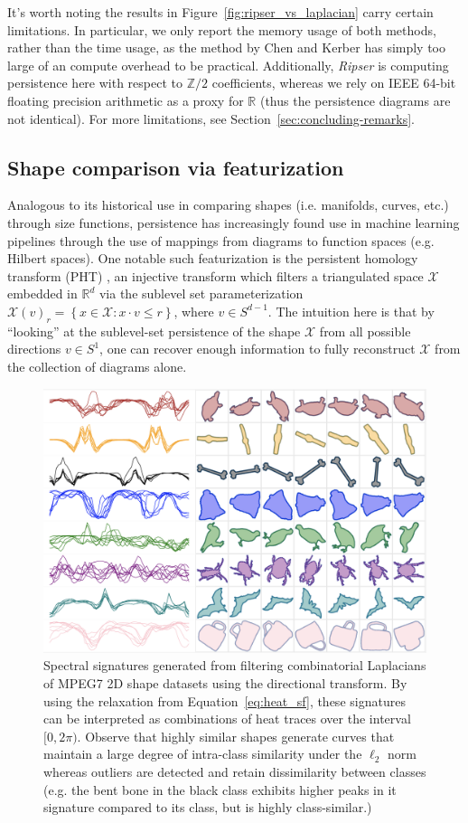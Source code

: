 \documentclass[pdflatex,sn-mathphys-num]{sn-jnl}
\begin{document}
It's worth noting the results in Figure~\ref{fig:ripser_vs_laplacian} carry certain limitations. In particular, we only report the memory usage of both methods, rather than the time usage, as the method by Chen and Kerber has simply too large of an compute overhead to be practical. Additionally, \emph{Ripser} is computing persistence here with respect to \(\mathbb{Z}/2\) coefficients, whereas we rely on IEEE 64-bit floating precision arithmetic as a proxy for \(\mathbb{R}\) (thus the persistence diagrams are not identical). For more limitations, see Section~\ref{sec:concluding-remarks}.

\subsection{Shape comparison via featurization}\label{sec:shape_comparison}

Analogous to its historical use in comparing shapes (i.e. manifolds, curves, etc.) through size functions, persistence has increasingly found use in machine learning pipelines through the use of mappings from diagrams to function spaces (e.g. Hilbert spaces). One notable such featurization is the persistent homology transform (PHT) \cite{turner2014persistent}, an injective transform which filters a triangulated space \(\mathcal{X}\) embedded in \(\mathbb{R}^{d}\) via the sublevel set parameterization \({\mathcal{X}(v)}_{r} = \left\{ x \in \mathcal{X}:x \cdot v \leq r \right\}\), where \(v \in S^{d - 1}\). The intuition here is that by ``looking'' at the sublevel-set persistence of the shape \(\mathcal{X}\) from all possible directions \(v \in S^{1}\), one can recover enough information to fully reconstruct \(\mathcal{X}\) from the collection of diagrams alone.

\begin{figure}
\centering
\includegraphics[width=0.65\linewidth,height=\textheight,keepaspectratio]{../images/mpeg7_heattrace.png}
\caption{Spectral signatures generated from filtering combinatorial Laplacians of MPEG7 2D shape datasets using the directional transform. By using the relaxation from Equation~\ref{eq:heat_sf}, these signatures can be interpreted as combinations of heat traces over the interval \(\lbrack 0,2\pi)\). Observe that highly similar shapes generate curves that maintain a large degree of intra-class similarity under the \(\ell_{2}\) norm whereas outliers are detected and retain dissimilarity between classes (e.g. the bent bone in the black class exhibits higher peaks in it signature compared to its class, but is highly class-similar.)}\label{fig:mpeg7_curves}
\end{figure}
\end{document}
